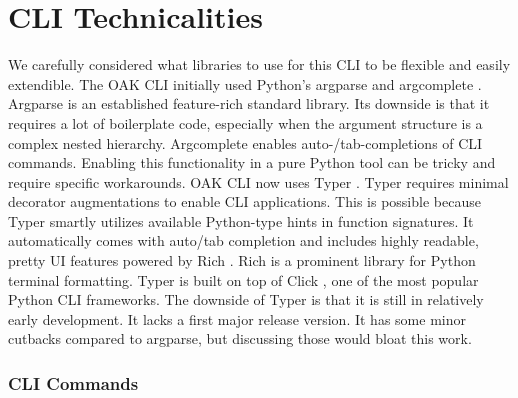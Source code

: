 \chapter{CLI Technicalities}\label{appendix:cli}

We carefully considered what libraries to use for this CLI to be flexible and easily extendible.
The OAK CLI initially used Python's argparse \cite{python_argparse} and argcomplete \cite{python_argcomplete}.
Argparse is an established feature-rich standard library.
Its downside is that it requires a lot of boilerplate code, especially when the argument structure is a complex nested hierarchy.
Argcomplete enables auto-/tab-completions of CLI commands.
Enabling this functionality in a pure Python tool can be tricky and require specific workarounds.
OAK CLI now uses Typer \cite{typer}.
Typer requires minimal decorator augmentations to enable CLI applications.
This is possible because Typer smartly utilizes available Python-type hints in function signatures.
It automatically comes with auto/tab completion and includes highly readable, pretty UI features powered by Rich \cite{rich}.
Rich is a prominent library for Python terminal formatting.
Typer is built on top of Click \cite{click}, one of the most popular Python CLI frameworks.
The downside of Typer is that it is still in relatively early development.
It lacks a first major release version.
It has some minor cutbacks compared to argparse, but discussing those would bloat this work.

\subsection{CLI Commands}

